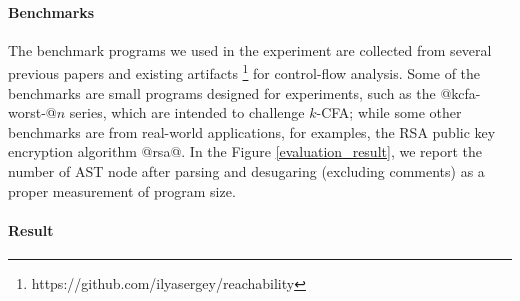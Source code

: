 \paragraph{Benchmarks}
The benchmark programs we used in the experiment are collected from several
previous papers \cite{Johnson:2013:OAA:2500365.2500604, ashley:practical,
DBLP:journals/corr/abs-1102-3676} and existing artifacts
\footnote{https://github.com/ilyasergey/reachability} for control-flow
analysis.  Some of the benchmarks are small programs designed for
experiments, such as the @kcfa-worst-@$n$ series, which are intended
to challenge $k$-CFA; while some other benchmarks are from real-world
applications, for examples, the RSA public key encryption algorithm
@rsa@. In the Figure \ref{evaluation_result}, we report the number of
AST node after parsing and desugaring (excluding comments) as a proper
measurement of program size.

\paragraph{Result}

